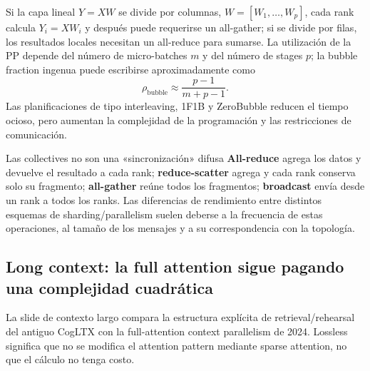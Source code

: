 
Si la capa lineal $Y=XW$ se divide por columnas, $W=[W_1,\ldots,W_p]$, cada rank calcula $Y_i=XW_i$ y después puede requerirse un all-gather; si se divide por filas, los resultados locales necesitan un all-reduce para sumarse. La utilización de la PP depende del número de micro-batches $m$ y del número de stages $p$; la bubble fraction ingenua puede escribirse aproximadamente como
\[
\rho_{\text{bubble}}\approx \frac{p-1}{m+p-1}.
\]
Las planificaciones de tipo interleaving, 1F1B y ZeroBubble reducen el tiempo ocioso, pero aumentan la complejidad de la programación y las restricciones de comunicación.

\begin{knowledgebox}{Las collectives no son una «sincronización» difusa}
\textbf{All-reduce} agrega los datos y devuelve el resultado a cada rank; \textbf{reduce-scatter} agrega y cada rank conserva solo su fragmento; \textbf{all-gather} reúne todos los fragmentos; \textbf{broadcast} envía desde un rank a todos los ranks. Las diferencias de rendimiento entre distintos esquemas de sharding/parallelism suelen deberse a la frecuencia de estas operaciones, al tamaño de los mensajes y a su correspondencia con la topología.
\end{knowledgebox}


\subsection{Long context: la full attention sigue pagando una complejidad cuadrática}

La slide de contexto largo compara la estructura explícita de retrieval/rehearsal del antiguo CogLTX con la full-attention context parallelism de 2024. Lossless significa que no se modifica el attention pattern mediante sparse attention, no que el cálculo no tenga costo.


